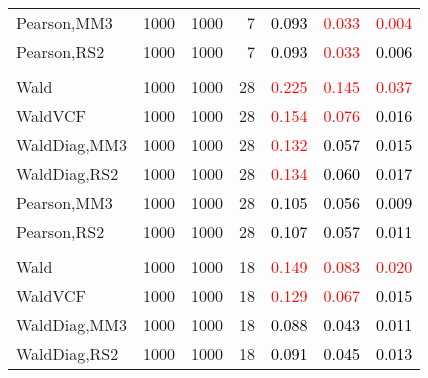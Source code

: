 \documentclass[
]{article}
\begin{document}
\begin{table}[H]
{\begin{tabular}[t]{lrrrrrr}
\hspace{1em}Pearson,MM3 & 1000 & 1000 & 7 & \textcolor{black}{0.093} & \textcolor{red}{0.033} & \textcolor{red}{0.004}\\
\hspace{1em}Pearson,RS2 & 1000 & 1000 & 7 & \textcolor{black}{0.093} & \textcolor{red}{0.033} & \textcolor{black}{0.006}\\
\addlinespace[0.3em]
\multicolumn{7}{l}{\textbf{1F 15V}}\\
\hspace{1em}Wald & 1000 & 1000 & 28 & \textcolor{red}{0.225} & \textcolor{red}{0.145} & \textcolor{red}{0.037}\\
\hspace{1em}WaldVCF & 1000 & 1000 & 28 & \textcolor{red}{0.154} & \textcolor{red}{0.076} & \textcolor{black}{0.016}\\
\hspace{1em}WaldDiag,MM3 & 1000 & 1000 & 28 & \textcolor{red}{0.132} & \textcolor{black}{0.057} & \textcolor{black}{0.015}\\
\hspace{1em}WaldDiag,RS2 & 1000 & 1000 & 28 & \textcolor{red}{0.134} & \textcolor{black}{0.060} & \textcolor{black}{0.017}\\
\hspace{1em}Pearson,MM3 & 1000 & 1000 & 28 & \textcolor{black}{0.105} & \textcolor{black}{0.056} & \textcolor{black}{0.009}\\
\hspace{1em}Pearson,RS2 & 1000 & 1000 & 28 & \textcolor{black}{0.107} & \textcolor{black}{0.057} & \textcolor{black}{0.011}\\
\addlinespace[0.3em]
\multicolumn{7}{l}{\textbf{2F 10V}}\\
\hspace{1em}Wald & 1000 & 1000 & 18 & \textcolor{red}{0.149} & \textcolor{red}{0.083} & \textcolor{red}{0.020}\\
\hspace{1em}WaldVCF & 1000 & 1000 & 18 & \textcolor{red}{0.129} & \textcolor{red}{0.067} & \textcolor{black}{0.015}\\
\hspace{1em}WaldDiag,MM3 & 1000 & 1000 & 18 & \textcolor{black}{0.088} & \textcolor{black}{0.043} & \textcolor{black}{0.011}\\
\hspace{1em}WaldDiag,RS2 & 1000 & 1000 & 18 & \textcolor{black}{0.091} & \textcolor{black}{0.045} & \textcolor{black}{0.013}\\

\end{tabular}}
\end{table}
\end{document}
